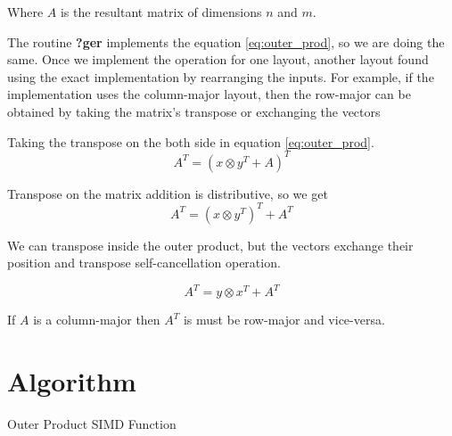 Where $A$ is the resultant matrix of dimensions $n$ and $m$.

The routine \textbf{?ger} implements the equation \ref{eq:outer_prod}, 
so we are doing the same. Once we implement the operation for one layout, 
another layout found using the exact implementation by rearranging 
the inputs. For example, if the implementation uses the column-major 
layout, then the row-major can be obtained by taking the matrix's 
transpose or exchanging the vectors

Taking the transpose on the both side in equation \ref{eq:outer_prod}.
\[A^T = (x \otimes y^T + A)^T\]

Transpose on the matrix addition is distributive, so we get
\[A^T = (x \otimes y^T)^T + A^T\]

We can transpose inside the outer product, but the vectors exchange 
their position and transpose self-cancellation operation.

\begin{equation}
    A^T = y \otimes x^T + A^T
    \label{eq:outer_prod_trans}
\end{equation}

If $A$ is a column-major then $A^T$ is must be row-major and vice-versa.

\section{Algorithm}

\begin{figure}[htb]
    \centering
\end{figure}

\begin{algorithm}[H]
    \SetAlgoLined

    \caption{Outer Product SIMD Function}
\end{algorithm}

